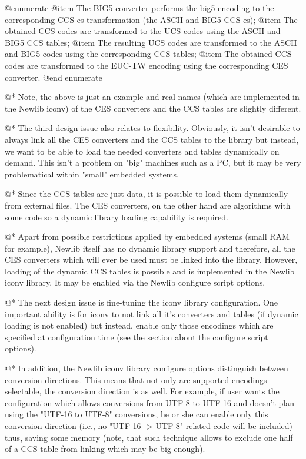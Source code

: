 @enumerate
@item
The BIG5 converter performs the big5 encoding to the corresponding CCS-es transformation
(the ASCII and BIG5 CCS-es);
@item
The obtained CCS codes are transformed to the UCS codes using the ASCII and BIG5 CCS tables;
@item
The resulting UCS codes are transformed to the ASCII and BIG5 codes using
the corresponding CCS tables;
@item
The obtained CCS codes are transformed to the EUC-TW encoding using the corresponding
CES converter.
@end enumerate

@*
Note, the above is just an example and real names (which are implemented
in the Newlib iconv) of the CES converters and the CCS tables are slightly different.

@*
The third design issue also relates to flexibility. Obviously, it isn't
desirable to always link all the CES converters and the CCS tables to the library
but instead, we want to be able to load the needed converters and tables
dynamically on demand. This isn't a problem on "big" machines such as
a PC, but it may be very problematical within "small" embedded systems.

@*
Since the CCS tables are just data, it is possible to load them
dynamically from external files.  The CES converters, on the other hand
are algorithms with some code so a dynamic library loading 
capability is required.

@*
Apart from possible restrictions applied by embedded systems (small
RAM for example), Newlib itself has no dynamic library support and
therefore, all the CES converters which will ever be used must be linked into
the library.   However, loading of the dynamic CCS tables is possible and is
implemented in the Newlib iconv library.  It may be enabled via the Newlib
configure script options.

@*
The next design issue is fine-tuning the iconv library
configuration.  One important ability is for iconv to not link all it's
converters and tables (if dynamic loading is not enabled) but instead,
enable only those encodings which are specified at configuration
time (see the section about the configure script options).

@*
In addition, the Newlib iconv library configure options distinguish between
conversion directions. This means that not only are supported encodings
selectable, the conversion direction is as well. For example, if user wants
the configuration which allows conversions from UTF-8 to UTF-16 and
doesn't plan using the "UTF-16 to UTF-8" conversions, he or she can 
enable only
this conversion direction (i.e., no "UTF-16 -> UTF-8"-related code will
be included) thus, saving some memory (note, that such technique allows to
exclude one half of a CCS table from linking which may be big enough).

